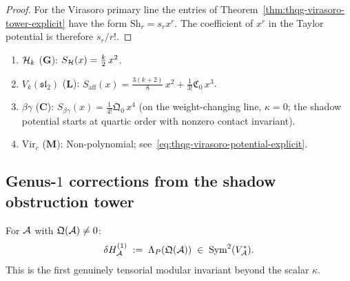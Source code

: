 \begin{proof}
For the Virasoro primary line the entries of
Theorem~\ref{thm:thqg-virasoro-tower-explicit} have the form
$\mathrm{Sh}_r=s_rx^r$.
The coefficient of $x^r$ in the Taylor potential is therefore
$s_r/r!$.
\end{proof}

\begin{example}
\begin{enumerate}[label=\textup{(\alph*)}]
\item $\mathcal{H}_k$ ($\mathbf{G}$):
 $S_{\mathcal{H}}(x) = \frac{k}{2}\,x^2$.
\item $V_k(\mathfrak{sl}_2)$ ($\mathbf{L}$):
 $S_{\mathrm{aff}}(x) = \frac{3(k+2)}{8}\,x^2
 + \frac{1}{3!}\mathfrak{C}_0\,x^3$.
\item $\beta\gamma$ ($\mathbf{C}$):
 $S_{\beta\gamma}(x) = \frac{1}{4!}\mathfrak{Q}_0\,x^4$
 (on the weight-changing line, $\kappa = 0$; the shadow potential
 starts at quartic order with nonzero contact invariant).
\item $\mathrm{Vir}_c$ ($\mathbf{M}$):
 Non-polynomial; see~\eqref{eq:thqg-virasoro-potential-explicit}.
\end{enumerate}
\end{example}



\subsection{Genus-$1$ corrections from the shadow obstruction tower}

\begin{theorem}
\ClaimStatusProvedHere
{}
For $\mathcal{A}$ with $\mathfrak{Q}(\mathcal{A}) \neq 0$:
\begin{equation}%
\delta H^{(1)}_\cA
\;:=\;
\Lambda_P(\mathfrak{Q}(\cA))
\;\in\;
\operatorname{Sym}^2(V_\cA^*).
\end{equation}
This is the first genuinely tensorial modular invariant
beyond the scalar $\kappa$.
\end{theorem}

